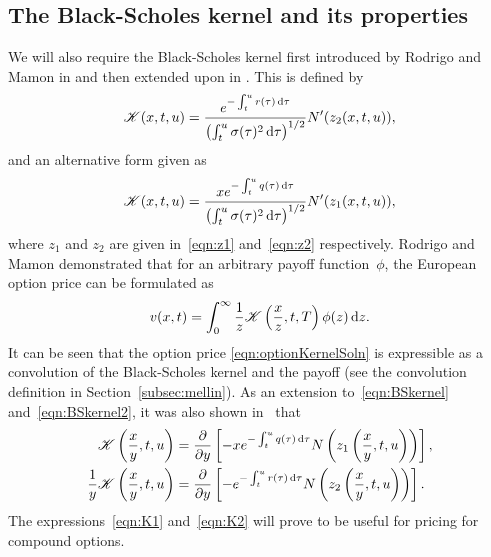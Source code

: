 \subsection{The Black-Scholes kernel and its properties}
We will also require the Black-Scholes kernel first introduced by Rodrigo and Mamon in \cite{Rodrigo2006} and then extended upon in \cite{Rodrigo2013}. This is defined by
	\begin{equation}
		\label{eqn:BSkernel}
		\mathscr K(x,t,u) = \frac{e^{-\int_t^u r(\tau)\,\mathrm d\tau}}{\left(\int_t^u \sigma(\tau)^2 \, \mathrm d\tau\right)^{1/2}}N'(z_2(x,t,u)),
	\end{equation}
and an alternative form given as
	\begin{equation}
		\label{eqn:BSkernel2}
		\mathscr K(x,t,u) = \frac{xe^{-\int_t^u q(\tau) \, \mathrm d\tau}}{\left(\int_t^u \sigma(\tau)^2 \, \mathrm d\tau\right)^{1/2}}N'(z_1(x,t,u)),
	\end{equation}
where $z_1$ and $z_2$ are given in~\eqref{eqn:z1} and~\eqref{eqn:z2} respectively. Rodrigo and Mamon demonstrated that for an arbitrary payoff function~$\phi$, the European option price can be formulated as
	\begin{equation}
		\label{eqn:optionKernelSoln}
		v(x,t) = \int_0^\infty \frac{1}{z}\mathscr K\left( \frac{x}{z}, t, T\right)\phi(z) \, \mathrm d z.
	\end{equation}
It can be seen that the option price \eqref{eqn:optionKernelSoln} is expressible as a convolution of the Black-Scholes kernel and the payoff (see the convolution definition in Section~\ref{subsec:mellin}). As an extension to~\eqref{eqn:BSkernel} and~\eqref{eqn:BSkernel2}, it was also shown in~\cite{Rodrigo2013} that
	\begin{align}
		\label{eqn:K1}
		\mathscr K\left(\frac{x}{y},t,u\right) &= \frac{\partial}{\partial y}\left[ -xe^{-\int_t^u q(\tau) \,\mathrm d\tau} N\left(z_1\left( \frac{x}{y},t,u \right) \right)\right], \\
		\label{eqn:K2}
		\frac{1}{y}\mathscr K\left(\frac{x}{y},t,u\right) &= \frac{\partial}{\partial y}\left[ -e^{-\int_t^u r(\tau) \,\mathrm d\tau} N\left(z_2\left( \frac{x}{y},t,u \right) \right)\right].
	\end{align}
The expressions~\eqref{eqn:K1} and~\eqref{eqn:K2} will prove to be useful for pricing for compound options.


